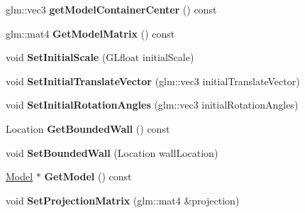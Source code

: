 \begin{DoxyCompactItemize}
\item 
\hypertarget{class_model_container_ac842121f3683631e63d232784841b1ea}{}glm\+::vec3 {\bfseries get\+Model\+Container\+Center} () const \label{class_model_container_ac842121f3683631e63d232784841b1ea}

\item 
\hypertarget{class_model_container_a277b409fafa9f2e51eca3ceaf05842b5}{}glm\+::mat4 {\bfseries Get\+Model\+Matrix} () const \label{class_model_container_a277b409fafa9f2e51eca3ceaf05842b5}

\item 
\hypertarget{class_model_container_adf273cf3b683f5f5452414d473afe2cb}{}void {\bfseries Set\+Initial\+Scale} (G\+Lfloat initial\+Scale)\label{class_model_container_adf273cf3b683f5f5452414d473afe2cb}

\item 
\hypertarget{class_model_container_a1ca63a7256501991de59f33452a20aae}{}void {\bfseries Set\+Initial\+Translate\+Vector} (glm\+::vec3 initial\+Translate\+Vector)\label{class_model_container_a1ca63a7256501991de59f33452a20aae}

\item 
\hypertarget{class_model_container_a29ae098cea587ffbd6595427045971b3}{}void {\bfseries Set\+Initial\+Rotation\+Angles} (glm\+::vec3 initial\+Rotation\+Angles)\label{class_model_container_a29ae098cea587ffbd6595427045971b3}

\item 
\hypertarget{class_model_container_a75175aeab083d162034b357205270759}{}Location {\bfseries Get\+Bounded\+Wall} () const \label{class_model_container_a75175aeab083d162034b357205270759}

\item 
\hypertarget{class_model_container_ae38be381c9c05dd5b6d505d1830d4264}{}void {\bfseries Set\+Bounded\+Wall} (Location wall\+Location)\label{class_model_container_ae38be381c9c05dd5b6d505d1830d4264}

\item 
\hypertarget{class_model_container_a0163bcb5b8ff80f52cfb043ec0f3aa63}{}\hyperlink{class_model}{Model} $\ast$ {\bfseries Get\+Model} () const \label{class_model_container_a0163bcb5b8ff80f52cfb043ec0f3aa63}

\item 
\hypertarget{class_model_container_a2a91fc30179a9da8195e704bcf6bb179}{}void {\bfseries Set\+Projection\+Matrix} (glm\+::mat4 \&projection)\label{class_model_container_a2a91fc30179a9da8195e704bcf6bb179}


\end{DoxyCompactItemize}

